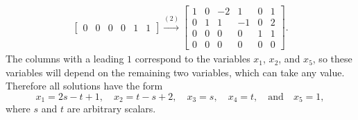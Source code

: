 \begin{solution}
\begin{gather*}
\begin{bmatrix}
      0 & 0 & 0 & 0 & 1 & 1
    \end{bmatrix}
    \xrightarrow{(2)}
    \begin{bmatrix}
      1 & 0 & -2 & 1 & 0 & 1 \\
      0 & 1 & 1 & -1 & 0 & 2 \\
      0 & 0 & 0 & 0 & 1 & 1 \\
      0 & 0 & 0 & 0 & 0 & 0
    \end{bmatrix}.
  \end{gather*}
  The columns with a leading $1$ correspond to the variables $x_1$,
  $x_2$, and $x_5$, so these variables will depend on the remaining
  two variables, which can take any value. Therefore all solutions
  have the form
  \begin{equation*}
    x_1 = 2s - t + 1,
    \quad
    x_2 = t - s + 2,
    \quad
    x_3 = s,
    \quad
    x_4 = t,
    \quad\text{and}\quad
    x_5 = 1,
  \end{equation*}
  where $s$ and $t$ are arbitrary scalars.
\end{solution}

